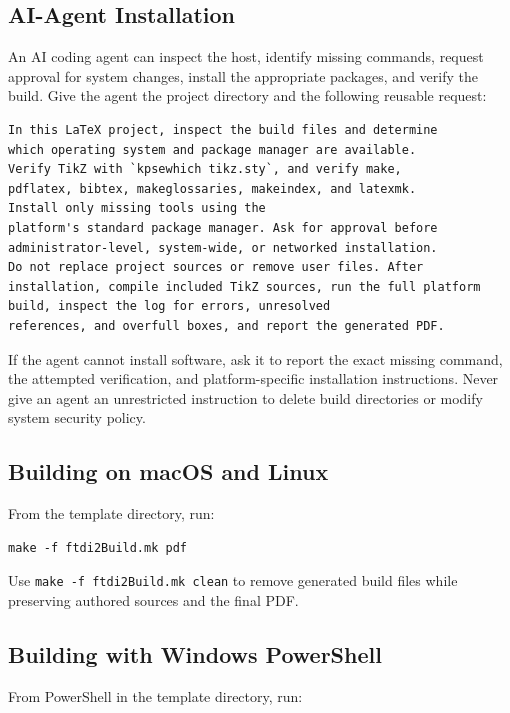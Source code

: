 \subsection{AI-Agent Installation}
\label{Section:AIAgentInstallation}

An AI coding agent can inspect the host, identify missing commands, request
approval for system changes, install the appropriate packages, and verify the
build. Give the agent the project directory and the following reusable request:

\begin{verbatim}
In this LaTeX project, inspect the build files and determine
which operating system and package manager are available.
Verify TikZ with `kpsewhich tikz.sty`, and verify make,
pdflatex, bibtex, makeglossaries, makeindex, and latexmk.
Install only missing tools using the
platform's standard package manager. Ask for approval before
administrator-level, system-wide, or networked installation.
Do not replace project sources or remove user files. After
installation, compile included TikZ sources, run the full platform
build, inspect the log for errors, unresolved
references, and overfull boxes, and report the generated PDF.
\end{verbatim}

If the agent cannot install software, ask it to report the exact missing
command, the attempted verification, and platform-specific installation
instructions. Never give an agent an unrestricted instruction to delete build
directories or modify system security policy.

\subsection{Building on macOS and Linux}

From the template directory, run:

\begin{verbatim}
make -f ftdi2Build.mk pdf
\end{verbatim}

Use \texttt{make -f ftdi2Build.mk clean} to remove generated build files while preserving authored sources and the final PDF.

\subsection{Building with Windows PowerShell}

From PowerShell in the template directory, run:

